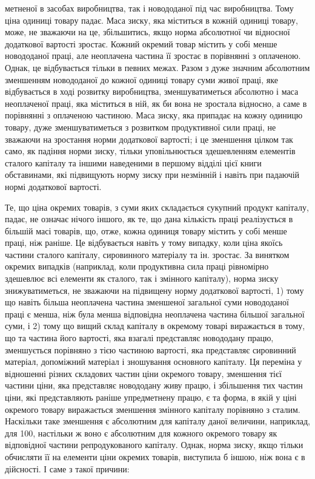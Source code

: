 метненої в засобах виробництва, так і новододаної під час виробництва. Тому ціна одиниці товару
падає. Маса зиску, яка міститься в кожній одиниці товару, може, не зважаючи на це, збільшитись, якщо
норма абсолютної чи відносної додаткової вартості зростає. Кожний окремий товар містить у собі менше
новододаної праці, але неоплачена частина її зростає в порівнянні з оплаченою. Однак, це
відбувається тільки в певних межах. Разом з дуже значним абсолютним зменшенням новододаної до кожної
одиниці товару суми живої праці, яке відбувається в ході розвитку виробництва, зменшуватиметься
абсолютно і маса неоплаченої праці, яка міститься в ній, як би вона не зростала відносно, а саме в
порівнянні з оплаченою частиною. Маса зиску, яка припадає на кожну одиницю товару, дуже
зменшуватиметься з розвитком продуктивної сили праці, не зважаючи на зростання норми додаткової
вартості; і це зменшення цілком так само, як падіння норми зиску, тільки уповільнюється здешевленням
елементів сталого капіталу та іншими наведеними в першому відділі цієї книги обставинами, які
підвищують норму зиску при незмінній і навіть при падаючій нормі додаткової вартості.

Те, що ціна окремих товарів, з суми яких складається сукупний продукт капіталу, падає, не означає
нічого іншого, як те, що дана кількість праці реалізується в більшій масі товарів, що, отже, кожна
одиниця товару містить у собі менше праці, ніж раніше. Це відбувається навіть у тому випадку, коли
ціна якоїсь частини сталого капіталу, сировинного матеріалу та ін. зростає. За винятком окремих
випадків (наприклад, коли продуктивна сила праці рівномірно здешевлює всі елементи як сталого, так і
змінного капіталу), норма зиску знижуватиметься, не зважаючи на підвищену норму додаткової вартості,
1) тому що навіть більша неоплачена частина зменшеної загальної суми новододаної праці є менша, ніж
була менша відповідна неоплачена частина більшої загальної суми, і 2) тому що вищий склад капіталу в
окремому товарі виражається в тому, що та частина його вартості, яка взагалі представляє новододану
працю, зменшується порівняно з тією частиною вартості, яка представляє сировинний матеріал,
допоміжний матеріал і зношування основного капіталу. Ця переміна у відношенні різних складових
частин ціни окремого товару, зменшення тієї частини ціни, яка представляє новододану живу працю, і
збільшення тих частин ціни, які представляють раніше упредметнену працю, є та форма, в якій у ціні
окремого товару виражається зменшення змінного капіталу порівняно з сталим. Наскільки таке зменшення
є абсолютним для капіталу даної величини, наприклад, для 100, настільки ж воно є абсолютним для
кожного окремого товару як відповідної частини репродукованого капіталу. Однак, норма зиску, якщо
тільки обчисляти її на елементи ціни окремих товарів, виступила б іншою, ніж вона є в дійсності. І
саме з такої причини:
